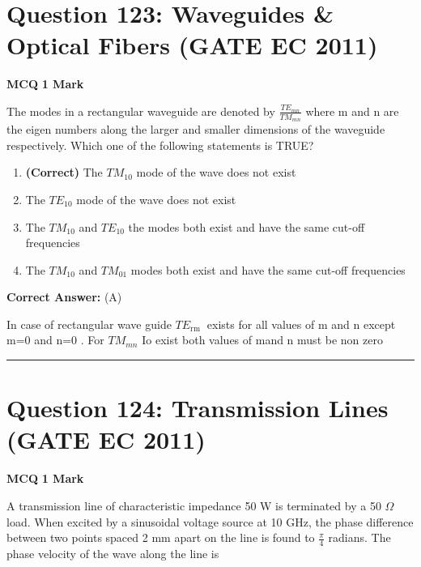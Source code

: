 \documentclass[11pt,a4paper]{article}
\begin{document}
\section*{Question 123: Waveguides \& Optical Fibers (GATE EC 2011)}
\noindent \textbf{\color{primary}MCQ} \hfill \textbf{\color{secondary}1 Mark}


\noindent The modes in a rectangular waveguide are denoted by $\frac{TE_{mn}}{TM_{mn}}$  where
m and n are the eigen numbers along the larger and smaller dimensions of the
waveguide respectively. Which one of the following statements is TRUE?


\begin{enumerate}[label=(\Alph*)]
    \item \textbf{(Correct)} The $TM_{10}$ mode of the wave does not exist
    \item The $TE_{10}$ mode of the wave does not exist
    \item The $TM_{10}$ and $TE_{10}$ the modes both exist and have the same cut-off frequencies
    \item The $TM_{10}$ and $TM_{01}$ modes both exist and have the same cut-off frequencies
\end{enumerate}

\noindent \textbf{Correct Answer:} (A)

\begin{tcolorbox}[solbox, title=Detailed Solution -- Question 123]
In case of rectangular wave guide  $T E_{\text {rm }}$  exists for  all values of  m  and  n except  m=0  and  n=0 . For   $T M_{m n}$  Io exist both values of mand  n  must be non
zero
\end{tcolorbox}

\vspace{1.5em}
\hrule
\vspace{1.5em}

\section*{Question 124: Transmission Lines (GATE EC 2011)}
\noindent \textbf{\color{primary}MCQ} \hfill \textbf{\color{secondary}1 Mark}


\noindent A transmission line of characteristic impedance 50 W is terminated by a 50 $\Omega$ load. When excited by a sinusoidal voltage source at 10 GHz, the phase
difference between two points spaced 2 mm apart on the line is found to $\frac{\pi }{4}$ radians. The phase velocity of the wave along the line is
\end{document}

